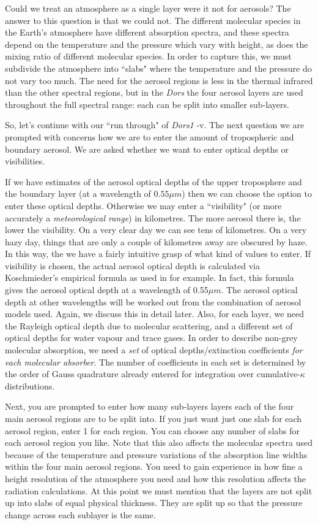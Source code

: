 \documentclass[12pt]{article}
\begin{document}
Could  we treat an atmosphere as a single layer were it not for aerosols? The answer to 
this question is that we could not.
The different molecular species in the Earth's atmosphere have different absorption spectra, and these spectra
depend on the temperature and the pressure which vary with height, as does the mixing ratio
of different molecular species.
In order to capture this, we must subdivide the atmosphere into ``slabs" where the temperature and
the pressure do not vary too much. The need for the aerosol regions is less in the thermal infrared
than the other spectral regions, but in the {\it Dors}  the four aerosol
layers are used throughout the full spectral range: each can be split into smaller sub-layers. 

So, let's  continue with  our ``run through" of {\it Dors1} -v.
 The next question we are prompted with  concerns how we are to enter the amount of tropospheric
and boundary aerosol. We are asked whether we want to enter optical depths or visibilities.

If we have estimates of the aerosol optical depths of the upper
troposphere and the boundary layer (at a wavelength of $0.55\mu m$) then we can choose the option to enter these optical depths.
Otherwise we may enter a ``visibility" (or more accurately a {\it meteorological range}) in kilometres.
The more aerosol there is, the lower the visibility. On a very clear day we can see tens of kilometres.
 On a very hazy day, things that are only a couple of kilometres away are obscured by haze. In
this way, the we have a fairly intuitive grasp of what kind of values to enter. If
 visibility
is chosen, the actual aerosol optical depth  is calculated via Koschmieder's empirical formula \cite{Koschmeider:Mybib} 
 as used in \cite{Longtin_etal:Mybib} for example.
In fact, this formula gives the aerosol optical depth at a wavelength of 0.55$\mu m$. The aerosol optical
depth at other wavelengths will be worked out from the combination of aerosol models used.
Again, we discuss this in detail later. Also, for each layer, we need the Rayleigh optical depth due to molecular scattering,
and a different set of optical depths for water vapour and trace gases. In order to describe non-grey molecular absorption,  we 
need a {\it set} of optical depths/extinction coefficients {\it for each molecular absorber}. The number of
coefficients in each set is determined by the order of Gauss quadrature already entered for integration over
 cumulative-$\kappa$ distributions.
 
Next, you are prompted to enter how many sub-layers layers each of
the four main aerosol regions are to be split into. If you just want just one slab for
each aerosol region, enter 1 for each region. You can choose any number of slabs for
each aerosol region you like. Note that this also affects the molecular spectra used
because of the temperature and pressure variations of the absorption line widths within the four main
aerosol regions. You need to
gain experience in how fine a height resolution of the atmosphere you need and how this resolution
 affects the radiation calculations. At this point we must mention
that the layers are not split up into slabs of equal physical thickness. They are split up
so that the pressure change across each sublayer is the same.
\end{document}
